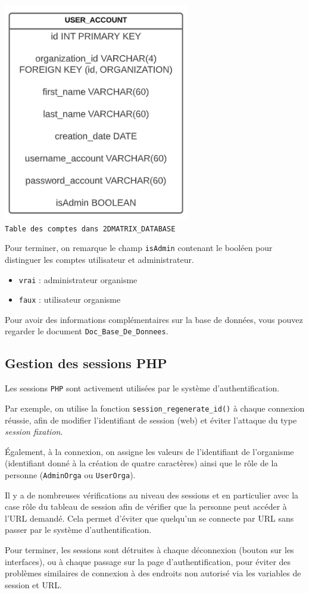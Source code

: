 \begin{center}
    \includegraphics[scale=0.5]{imgs/bd.PNG}\\
    \texttt{Table des comptes dans 2DMATRIX\_DATABASE}
\end{center}
 Pour terminer, on remarque le champ \texttt{isAdmin} contenant le booléen pour distinguer les comptes utilisateur et administrateur.
 
\begin{itemize}
     \item \texttt{vrai} : administrateur organisme
     \item \texttt{faux} : utilisateur organisme
\end{itemize}

Pour avoir des informations complémentaires sur la base de données, vous pouvez regarder le document \texttt{Doc\_Base\_De\_Donnees}.

\subsection{Gestion des sessions PHP}

Les sessions \texttt{PHP} sont activement utilisées par le système d'authentification. 

Par exemple, on utilise la fonction \texttt{session\_regenerate\_id()} à chaque connexion réussie, afin de modifier l'identifiant de session (web) et éviter l'attaque du type \textit{session fixation}. 

Également, à la connexion, on assigne les valeurs de l'identifiant de l'organisme (identifiant donné à la création de quatre caractères) ainsi que le rôle de la personne (\texttt{AdminOrga} ou \texttt{UserOrga}).  

Il y a de nombreuses vérifications au niveau des sessions et en particulier avec la case rôle du tableau de session afin de vérifier que la personne peut accéder à l'URL demandé. Cela permet d'éviter que quelqu'un se connecte par URL sans passer par le système d'authentification.

Pour terminer, les sessions sont détruites à chaque déconnexion (bouton sur les interfaces), ou à chaque passage sur la page d'authentification, pour éviter des problèmes similaires de connexion à des endroits non autorisé via les variables de session et URL.